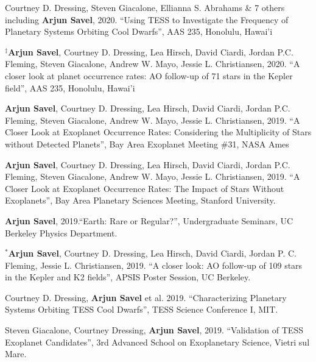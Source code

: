 \documentclass[12pt,letterpaper]{article}
\begin{document}
\begin{list}{}{\cvlist}

\item[{\color{numcolor}\scriptsize8}] Courtney D. Dressing, Steven Giacalone, Ellianna S. Abrahams \& 7 others including \textbf{Arjun Savel}, 2020. ``Using TESS to Investigate the Frequency of Planetary Systems Orbiting Cool Dwarfs'', AAS 235, Honolulu, Hawai'i

\item[{\color{numcolor}\scriptsize7}] $^\ddagger$\textbf{Arjun Savel}, Courtney D. Dressing, Lea Hirsch, David Ciardi, Jordan P.C. Fleming, Steven Giacalone, Andrew W. Mayo, Jessie L. Christiansen, 2020. “A closer look at planet occurrence rates: AO follow-up of 71 stars in the Kepler field”, AAS 235, Honolulu, Hawai'i

\item[{\color{numcolor}\scriptsize6}] \textbf{Arjun Savel}, Courtney D. Dressing, Lea Hirsch, David Ciardi, Jordan P.C. Fleming, Steven Giacalone, Andrew W. Mayo, Jessie L. Christiansen, 2019. “A Closer Look at Exoplanet Occurrence Rates: Considering the Multiplicity of Stars without Detected Planets”, Bay Area Exoplanet Meeting \#31, NASA Ames

\item[{\color{numcolor}\scriptsize5}] \textbf{Arjun Savel}, Courtney D. Dressing, Lea Hirsch, David Ciardi, Jordan P.C. Fleming, Steven Giacalone, Andrew W. Mayo, Jessie L. Christiansen, 2019. “A Closer Look at Exoplanet Occurrence Rates: The Impact of Stars Without Exoplanets”, Bay Area Planetary Sciences Meeting, Stanford University.

\item[{\color{numcolor}\scriptsize4}] \textbf{Arjun Savel}, 2019.“Earth: Rare or Regular?”, Undergraduate Seminars, UC Berkeley Physics Department.

\item[{\color{numcolor}\scriptsize3}] $^*$\textbf{Arjun Savel}, Courtney D. Dressing, Lea Hirsch, David Ciardi, Jordan P. C. Fleming, Jessie L. Christiansen, 2019. “A closer look: AO follow-up of 109 stars in the Kepler and K2 fields”, APSIS Poster Session, UC Berkeley.

\item[{\color{numcolor}\scriptsize2}] Courtney D. Dressing, \textbf{Arjun Savel} et al. 2019. “Characterizing Planetary Systems Orbiting TESS Cool Dwarfs”, TESS Science Conference I, MIT.

\item[{\color{numcolor}\scriptsize1}] Steven Giacalone, Courtney Dressing, \textbf{Arjun Savel}, 2019. “Validation of TESS Exoplanet Candidates”, 3rd Advanced School on Exoplanetary Science, Vietri sul Mare.

\end{list}
\end{document}
